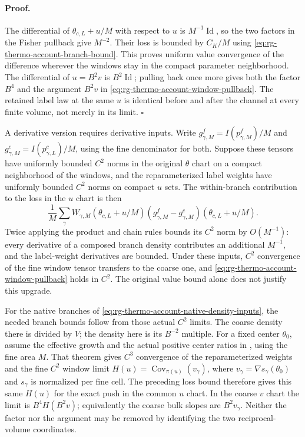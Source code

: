 \paragraph{Proof.}
The differential of $\theta_{c,L}+u/M$ with respect to $u$ is
$M^{-1}\operatorname{Id}$, so the two factors in the Fisher pullback
give $M^{-2}$. Their loss is bounded by $C_K/M$ using
\cref{eq:rg-thermo-account-branch-bound}. This proves uniform value
convergence of the difference wherever the windows stay in the compact
parameter neighborhood. The differential of $u=B^2v$ is
$B^2\operatorname{Id}$; pulling back once more gives both the factor
$B^4$ and the argument $B^2v$ in
\cref{eq:rg-thermo-account-window-pullback}. The retained label law
at the same $u$ is identical before and after the channel at every finite
volume, not merely in its limit. $\square$

A derivative version requires derivative inputs. Write
$g_{\gamma,M}^f=I(p^f_{\gamma,M})/M$ and
$g_{\gamma,M}^c=I(p^c_{\gamma,L})/M$, using the fine denominator
for both. Suppose these tensors have uniformly bounded $C^2$ norms in
the original $\theta$ chart on a compact neighborhood of the windows,
and the reparameterized label weights have uniformly bounded $C^2$
norms on compact $u$ sets. The within-branch contribution to the loss
in the $u$ chart is then
\begin{equation}
 \frac1M\sum_\gamma W_{\gamma,M}(\theta_{c,L}+u/M)
 (g_{\gamma,M}^f-g_{\gamma,M}^c)(\theta_{c,L}+u/M).
 \label{eq:rg-thermo-account-window-loss}
\end{equation}
Twice applying the product and chain rules bounds its $C^2$ norm by
$O(M^{-1})$: every derivative of a composed branch density contributes
an additional $M^{-1}$, and the label-weight derivatives are bounded.
Under these inputs, $C^2$ convergence of the fine window tensor
transfers to the coarse one, and
\cref{eq:rg-thermo-account-window-pullback} holds in $C^2$.
The original value bound alone does not justify this upgrade.

For the native branches of
\cref{eq:rg-thermo-account-native-density-inputs}, the needed branch
bounds follow from those actual $C^2$ limits. The coarse density there
is divided by $V$; the density here is its $B^{-2}$ multiple.
For a fixed center $\theta_0$, assume the effective growth and the
actual positive center ratios in
, using the fine area $M$.
That theorem gives $C^3$ convergence of the reparameterized weights
and the fine $C^2$ window limit
$H(u)=\operatorname{Cov}_{\pi(u)}(v_\gamma)$, where
$v_\gamma=\nabla s_\gamma(\theta_0)$ and $s_\gamma$ is normalized
per fine cell. The preceding loss bound therefore gives this same
$H(u)$ for the exact push in the common $u$ chart. In the coarse
$v$ chart the limit is $B^4H(B^2v)$; equivalently the coarse bulk
slopes are $B^2v_\gamma$. Neither the factor nor the argument may be
removed by identifying the two reciprocal-volume coordinates.

